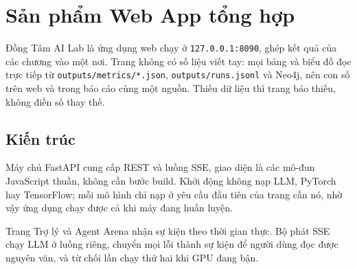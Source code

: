 \chapter{Sản phẩm Web App tổng hợp}\label{chap:web}

Đồng Tâm AI Lab là ứng dụng web chạy ở \texttt{127.0.0.1:8090}, ghép kết quả của các chương vào một nơi. Trang không có số liệu viết tay: mọi bảng và biểu đồ đọc trực tiếp từ \texttt{outputs/metrics/*.json}, \texttt{outputs/runs.jsonl} và Neo4j, nên con số trên web và trong báo cáo cùng một nguồn. Thiếu dữ liệu thì trang báo thiếu, không điền số thay thế.

\section{Kiến trúc}
Máy chủ FastAPI cung cấp REST và luồng SSE, giao diện là các mô-đun JavaScript thuần, không cần bước build. Khởi động không nạp LLM, PyTorch hay TensorFlow; mỗi mô hình chỉ nạp ở yêu cầu đầu tiên của trang cần nó, nhờ vậy ứng dụng chạy được cả khi máy đang huấn luyện.


Trang Trợ lý và Agent Arena nhận sự kiện theo thời gian thực. Bộ phát SSE chạy LLM ở luồng riêng, chuyển mọi lỗi thành sự kiện để người dùng đọc được nguyên văn, và từ chối lần chạy thứ hai khi GPU đang bận.



